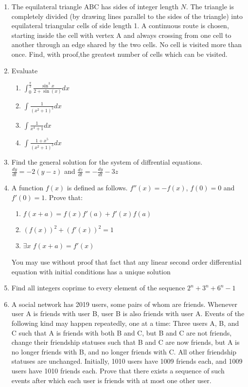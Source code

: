 \documentclass[a4paper]{article}
\begin{document}
\begin{enumerate}
	\item
	The equilateral triangle ABC has sides of integer length $N$. The triangle is completely divided (by drawing lines parallel to the sides of the triangle) into equilateral triangular cells of side length 1. A continuous route is chosen, starting inside the cell with vertex A and always crossing from one cell to another through an edge shared by the two cells. No cell is visited more than once. Find, with proof,the greatest number of cells which can be visited.

	\item
	Evaluate
	\begin{enumerate}
	    \item 
    	$\int_{0}^{\frac{\pi}{2}} \frac{\sin^3{x}}{2 + \sin(x)} dx$

        \item
    	$\int{\frac{1}{(x^2+1)^{2}}}dx$
    	
    	\item
    	$\int{\frac{1}{x^{4}+1}}dx$
    	
    	\item
    	$\int{\frac{1+x^{5}}{(x^{2}+1)^{3}}}dx$
	\end{enumerate}

	\item
	Find the general solution for the system of diffrential equations.
	$\frac{dy}{dt} = -2(y-z)$ and $\frac{dz}{dt} = -\frac{dy}{dt} - 3z$
	
	\item
	A function $f(x)$ is defined as follows. $f''(x) = -f(x)$, $f(0) = 0$ and $f'(0) = 1$. Prove that:
	\begin{enumerate}
	    \item $f(x + a) = f(x)f'(a) + f'(x)f(a)$
	    \item $(f(x))^2 + (f'(x))^2 = 1$
	    \item $\exists x$ $f(x+a) = f'(x)$
	\end{enumerate}
	You may use without proof that fact that any linear second order differential equation with initial conditions has a unique solution
	
	\item
	Find all integers coprime to every element of the sequence $2^{n} + 3^{n} + 6^{n}-1$
	
	\item
	A social network has 2019 users, some pairs of whom are friends. Whenever user A
    is friends with user B, user B is also friends with user A. Events of the following kind may happen
    repeatedly, one at a time:
    Three users A, B, and C such that A is friends with both B and C, but B and C are
    not friends, change their friendship statuses such that B and C are now friends, but A is
    no longer friends with B, and no longer friends with C. All other friendship statuses are
    unchanged.
    Initially, 1010 users have 1009 friends each, and 1009 users have 1010 friends each. Prove that there
    exists a sequence of such events after which each user is friends with at most one other user.
    

\end{enumerate}
\end{document}
